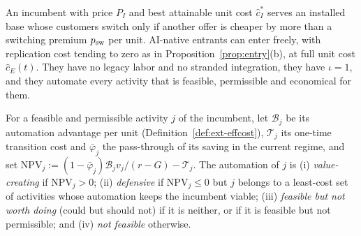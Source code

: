 \begin{assumption}\label{ass:ext-entrant}
An incumbent with price $P_I$ and best attainable unit cost $\hat c_I^*$ serves an installed base whose customers switch only if another offer is cheaper by more than a switching premium $p_{\rm sw}$ per unit. AI-native entrants can enter freely, with replication cost tending to zero as in Proposition~\ref{prop:entry}(b), at full unit cost $\hat c_E(t)$. They have no legacy labor and no stranded integration, they have $\iota=1$, and they automate every activity that is feasible, permissible and economical for them.
\end{assumption}

\begin{definition}\label{def:ext-motives}
For a feasible and permissible activity $j$ of the incumbent, let $\mathcal B_j$ be its automation advantage per unit (Definition~\ref{def:ext-effcost}), $\mathcal T_j$ its one-time transition cost and $\bar\varphi_j$ the pass-through of its saving in the current regime, and set $\mathrm{NPV}_j:=(1-\bar\varphi_j)\mathcal B_jv_j/(r-G)-\mathcal T_j$. The automation of $j$ is (i) \emph{value-creating} if $\mathrm{NPV}_j>0$; (ii) \emph{defensive} if $\mathrm{NPV}_j\le0$ but $j$ belongs to a least-cost set of activities whose automation keeps the incumbent viable; (iii) \emph{feasible but not worth doing} (could but should not) if it is neither, or if it is feasible but not permissible; and (iv) \emph{not feasible} otherwise.
\end{definition}

